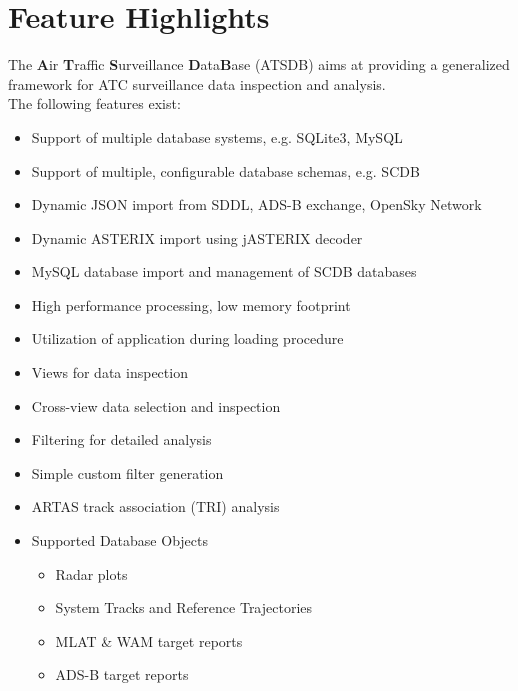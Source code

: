 \section{Feature Highlights}

The \textbf{A}ir \textbf{T}raffic \textbf{S}urveillance \textbf{D}ata\textbf{B}ase (ATSDB) aims at providing a generalized framework for ATC surveillance data inspection and analysis. \\

The following features exist: \\

\begin{itemize}  
\item Support of multiple database systems, e.g. SQLite3, MySQL
\item Support of multiple, configurable database schemas, e.g. SCDB
\item Dynamic JSON import from SDDL, ADS-B exchange, OpenSky Network
\item Dynamic ASTERIX import using jASTERIX decoder
\item MySQL database import and management of SCDB databases
\item High performance processing, low memory footprint
\item Utilization of application during loading procedure
\item Views for data inspection
\item Cross-view data selection and inspection
\item Filtering for detailed analysis
\item Simple custom filter generation
\item ARTAS track association (TRI) analysis
\item Supported Database Objects
\begin{itemize}  
\item Radar plots
\item System Tracks and Reference Trajectories
\item MLAT \& WAM target reports
\item ADS-B target reports
\end{itemize}
\end{itemize} 
